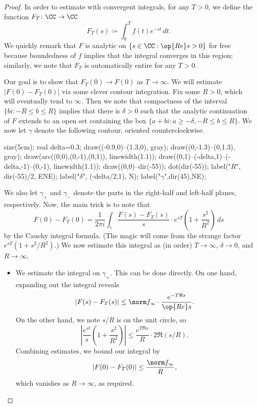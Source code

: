 \documentclass[../thesis.tex]{subfiles}
\begin{document}
\begin{proof}
	In order to estimate with convergent integrals, for any $T>0$, we define the function $F_T\colon\CC\to\CC$
	\[F_T(s)\coloneqq\int_0^Tf(t)e^{-st}\,dt.\]
	We quickly remark that $F$ is analytic on $\{s\in\CC:\op{Re}s>0\}$ for free because boundedness of $f$ implies that the integral converges in this region; similarly, we note that $F_T$ is automatically entire for any $T>0$.

	Our goal is to show that $F_T(0)\to F(0)$ as $T\to\infty$. We will estimate $\left|F(0)-F_T(0)\right|$ via some clever contour integration. Fix some $R>0$, which will eventually tend to $\infty$. Then we note that compactness of the interval $\{bi:-R\le b\le R\}$ implies that there is $\delta>0$ such that the analytic continuation of $F$ extends to an open set containing the box $\{a+bi:a\ge-\delta,-R\le b\le R\}$. We now let $\gamma$ denote the following contour, oriented counterclockwise.
	\begin{center}
		\begin{asy}
			size(5cm);
			real delta=0.3;
			draw((-0.9,0)--(1.3,0), gray);
			draw((0,-1.3)--(0,1.3), gray);
			draw(arc((0,0),(0,-1),(0,1)), linewidth(1.1));
			draw((0,1)--(-delta,1)--(-delta,-1)--(0,-1), linewidth(1.1));
			draw((0,0)--dir(-55));
			dot(dir(-55));
			label("$R$", dir(-55)/2, ENE);
			label("$\delta$", (-delta/2,1), N);
			label("$\gamma$",dir(45),NE);
		\end{asy}
	\end{center}
	We also let $\gamma_+$ and $\gamma_-$ denote the parts in the right-half and left-half planes, respectively. Now, the main trick is to note that
	\[F(0)-F_T(0)=\frac1{2\pi i}\int_\gamma\frac{F(s)-F_T(s)}s\cdot e^{sT}\left(1+\frac{s^2}{R^2}\right)\,ds\]
	by the Cauchy integral formula. (The magic will come from the strange factor $e^{sT}\left(1+s^2/R^2\right)$.) We now estimate this integral as (in order) $T\to\infty$, $\delta\to0$, and $R\to\infty$.
	\begin{itemize}
		\item We estimate the integral on $\gamma_+$. This can be done directly. On one hand, expanding out the integral reveals
		\[\left|F(s)-F_T(s)\right|\le\norm f_\infty\cdot\frac{e^{-T\Re s}}{\op{Re}s}.\]
		On the other hand, we note $s/R$ is on the unit circle, so
		\[\left|\frac{e^{st}}s\left(1+\frac{s^2}{R^2}\right)\right|\le\frac{e^{T\Re s}}{R}\cdot2\Re(s/R).\]
		Combining estimates, we bound our integral by
		\[\left|F(0)-F_T(0)\right|\le\frac{\norm f_\infty}{R},\]
		which vanishes as $R\to\infty$, as required.

\end{itemize}
\end{proof}
\end{document}
